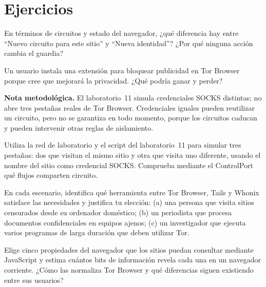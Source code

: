 \section*{Ejercicios}

\begin{esercizio}[1]\label{es:23-identita}
En términos de circuitos y estado del navegador, ¿qué diferencia hay entre \enquote{Nuevo circuito para este sitio} y \enquote{Nueva identidad}? ¿Por qué ninguna acción cambia el guardia?
\end{esercizio}

\begin{esercizio}[1]\label{es:23-estensioni}
Un usuario instala una extensión para bloquear publicidad en Tor Browser porque cree que mejorará la privacidad. ¿Qué podría ganar y perder?
\end{esercizio}

\textbf{Nota metodológica.} El laboratorio~11 simula credenciales SOCKS distintas; no abre tres pestañas reales de Tor Browser. Credenciales iguales pueden reutilizar un circuito, pero no se garantiza en todo momento, porque los circuitos caducan y pueden intervenir otras reglas de aislamiento.

\begin{esercizio}[2]\label{es:23-isolamento}
Utiliza la red de laboratorio y el script del laboratorio~11 para simular tres pestañas: dos que visitan el mismo sitio y otra que visita uno diferente, usando el nombre del sitio como credencial SOCKS. Comprueba mediante el ControlPort qué flujos comparten circuito.
\end{esercizio}

\begin{esercizio}[2]\label{es:23-scelta}
En cada escenario, identifica qué herramienta entre Tor Browser, Tails y Whonix satisface las necesidades y justifica tu elección: (a) una persona que visita sitios censurados desde su ordenador doméstico; (b) un periodista que procesa documentos confidenciales en equipos ajenos; (c) un investigador que ejecuta varios programas de larga duración que deben utilizar Tor.
\end{esercizio}

\begin{esercizio}[3]\label{es:23-impronta}
Elige cinco propiedades del navegador que los sitios puedan consultar mediante JavaScript y estima cuántos bits de información revela cada una en un navegador corriente. ¿Cómo las normaliza Tor Browser y qué diferencias siguen existiendo entre sus usuarios?
\end{esercizio}

